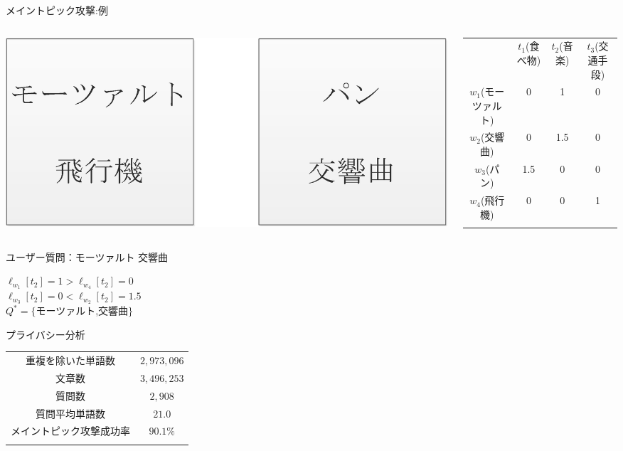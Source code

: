 \documentclass[14pt,xcolor=dvipsnames,table,dvipdfmx]{beamer}
\begin{document}
\begin{frame}{メイントピック攻撃:例}
	\begin{exampleblock}{}
      		 \begin{columns}[c]
           		\begin{column}{0.3\textwidth} %
               		\includegraphics[width=\columnwidth]{rk16.png}
		   	\end{column}
       		\begin{column}{0.68\textwidth} %
\fontsize{9pt}{7.2}\selectfont
				\begin{tabular}{|c|c|c|c|}
				\noalign{\hrule height 1pt}
				  & $t_1$(食べ物) & $t_2$(音楽) & $t_3$(交通手段) \\
				\noalign{\hrule height 1pt}
				$w_1$(モーツァルト) & 0 & 1 & 0 \\
				\noalign{\hrule height 1pt}
				$w_2$(交響曲) & 0 & 1.5 & 0 \\
				\noalign{\hrule height 1pt}
				$w_3$(パン) & 1.5 & 0 & 0 \\
				\noalign{\hrule height 1pt}
				$w_4$(飛行機) & 0 & 0 & 1 \\
				\noalign{\hrule height 1pt}
				\end{tabular}
			\end{column}
		\end{columns}
		ユーザー質問：モーツァルト 交響曲
	\end{exampleblock}
	\begin{block}{}
   		$ \ell_{w_1}[t_2] = 1 > \ell_{w_4}[t_2] = 0 $ \\
   		$ \ell_{w_3}[t_2] = 0 < \ell_{w_2}[t_2] = 1.5 $ \\
   		$Q^* = \{$モーツァルト,交響曲$\} $
	\end{block}
\end{frame}

\begin{frame}{プライバシー分析}
	\begin{center}
		\begin{tabular}{|c|c|}
		\noalign{\hrule height 1pt}
		重複を除いた単語数 & $2,973,096$  \\
		文章数 & $3,496,253$ \\
		質問数 & $2,908$ \\
		質問平均単語数 & $21.0$ \\
		メイントピック攻撃成功率 & $90.1\%$ \\
		\noalign{\hrule height 1pt}
		\end{tabular}
	\end{center}
\end{frame}
\end{document}
